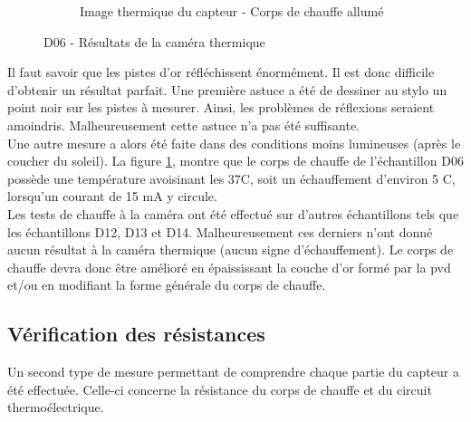 \begin{figure}[H]
\begin{subfigure}{0.3\textwidth}
        \caption{Image thermique du capteur - Corps de chauffe allumé}
    \end{subfigure}
    \caption{D06 - Résultats de la caméra thermique}
    \label{fig:cameraThermique}
\end{figure}

Il faut savoir que les pistes d'or réfléchissent énormément. Il est donc difficile d'obtenir un résultat parfait. Une première astuce a été de
dessiner au stylo un point noir sur les pistes à mesurer. Ainsi, les problèmes de réflexions seraient amoindris. Malheureusement cette astuce n'a
pas été suffisante. \\

Une autre mesure a alors été faite dans des conditions moins lumineuses (après le coucher du soleil). La figure \ref*{fig:cameraThermique},
montre que le corps de chauffe de l'échantillon D06 possède une température avoisinant les 37\textdegree C, soit un échauffement d'environ 5
\textdegree C, lorsqu'un courant de 15 mA y circule. \\

Les tests de chauffe à la caméra ont été effectué sur d'autres échantillons tels que les échantillons D12, D13 et D14. Malheureusement ces derniers 
n'ont donné aucun résultat à la caméra thermique (aucun signe d'échauffement). Le corps de chauffe devra donc être amélioré en épaississant la 
couche d'or formé par la \gls{pvd} et/ou en modifiant la forme générale du corps de chauffe. 

\subsection{Vérification des résistances}
Un second type de mesure permettant de comprendre chaque partie du \gls{capteur} a été effectuée. Celle-ci concerne la résistance du corps de
chauffe et du circuit thermoélectrique.

